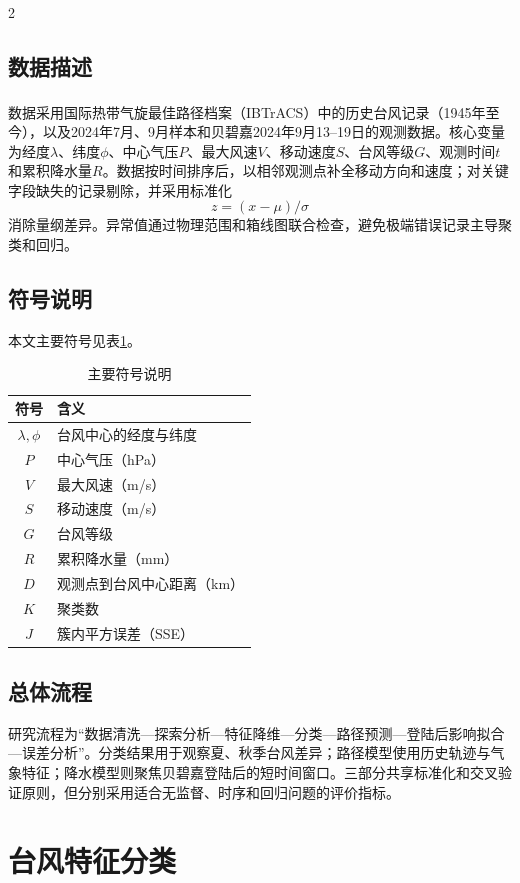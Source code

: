 \documentclass[10.5pt,compsoc,UTF8]{CjC}
\newcommand{\upcite}[1]{\textsuperscript{\cite{#1}}}
\begin{document}
\begin{multicols}{2}
\subsection{数据描述}
数据采用国际热带气旋最佳路径档案（IBTrACS）\upcite{knapp2010ibtracs}中的历史台风记录（1945年至今），以及2024年7月、9月样本和贝碧嘉2024年9月13--19日的观测数据。核心变量为经度$\lambda$、纬度$\phi$、中心气压$P$、最大风速$V$、移动速度$S$、台风等级$G$、观测时间$t$和累积降水量$R$。数据按时间排序后，以相邻观测点补全移动方向和速度；对关键字段缺失的记录剔除，并采用标准化
\begin{equation}
z=(x-\mu)/\sigma
\end{equation}
消除量纲差异。异常值通过物理范围和箱线图联合检查，避免极端错误记录主导聚类和回归。

\subsection{符号说明}
本文主要符号见表\ref{tab:symbol}。
\begin{table}[H]\centering\small\caption{主要符号说明}\label{tab:symbol}
\begin{tabular}{cl}
\toprule
符号 & 含义\\
\midrule
$\lambda,\phi$ & 台风中心的经度与纬度\\
$P$ & 中心气压（hPa）\\
$V$ & 最大风速（m/s）\\
$S$ & 移动速度（m/s）\\
$G$ & 台风等级\\
$R$ & 累积降水量（mm）\\
$D$ & 观测点到台风中心距离（km）\\
$K$ & 聚类数\\
$J$ & 簇内平方误差（SSE）\\
\bottomrule
\end{tabular}
\end{table}

\subsection{总体流程}
研究流程为“数据清洗—探索分析—特征降维—分类—路径预测—登陆后影响拟合—误差分析”。分类结果用于观察夏、秋季台风差异；路径模型使用历史轨迹与气象特征；降水模型则聚焦贝碧嘉登陆后的短时间窗口。三部分共享标准化和交叉验证原则，但分别采用适合无监督、时序和回归问题的评价指标。

\section{台风特征分类}

\end{multicols}
\end{document}
